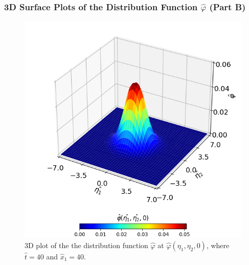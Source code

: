 \documentclass[a4paper]{article}
\begin{document}
\clearpage
\subsubsection{3D Surface Plots of the Distribution Function $\hat{\varphi}$ (Part B)}
\begin{figure}[hbt!]
    \centering
    \includegraphics[width=14cm]{plots/problem_b_1.png}
    \caption{\centering 3D plot of the the distribution function $\hat{\varphi}$ at $\hat{\varphi}(\eta_1, \eta_2, 0)$, where $\hat{t} = 40$ and $\hat{x}_1 = 40$.}
    \label{problem_b_1}
\end{figure}
\clearpage
\end{document}
